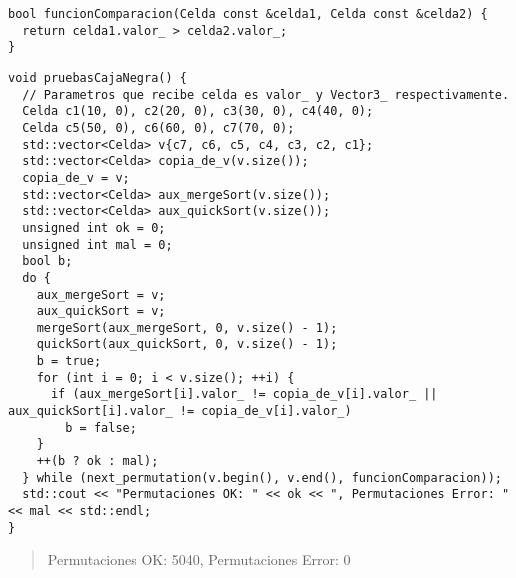 \begin{lstlisting}
bool funcionComparacion(Celda const &celda1, Celda const &celda2) {
  return celda1.valor_ > celda2.valor_;
}

\end{lstlisting}

\begin{lstlisting}
void pruebasCajaNegra() {
  // Parametros que recibe celda es valor_ y Vector3_ respectivamente.
  Celda c1(10, 0), c2(20, 0), c3(30, 0), c4(40, 0);
  Celda c5(50, 0), c6(60, 0), c7(70, 0);
  std::vector<Celda> v{c7, c6, c5, c4, c3, c2, c1};
  std::vector<Celda> copia_de_v(v.size());
  copia_de_v = v;
  std::vector<Celda> aux_mergeSort(v.size());
  std::vector<Celda> aux_quickSort(v.size());
  unsigned int ok = 0;
  unsigned int mal = 0;
  bool b;
  do {
    aux_mergeSort = v;
    aux_quickSort = v;
    mergeSort(aux_mergeSort, 0, v.size() - 1);
    quickSort(aux_quickSort, 0, v.size() - 1);
    b = true;
    for (int i = 0; i < v.size(); ++i) {
      if (aux_mergeSort[i].valor_ != copia_de_v[i].valor_ || aux_quickSort[i].valor_ != copia_de_v[i].valor_)
        b = false;
    }
    ++(b ? ok : mal);
  } while (next_permutation(v.begin(), v.end(), funcionComparacion));
  std::cout << "Permutaciones OK: " << ok << ", Permutaciones Error: " << mal << std::endl;
}
\end{lstlisting}
\begin{quote}
    Permutaciones OK: 5040, Permutaciones Error: 0    
\end{quote}
